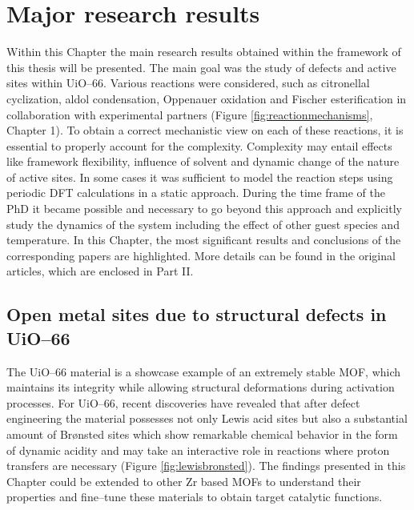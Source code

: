\graphicspath{{figures/}}
\renewcommand\evenpagerightmark{{\scshape\small Major research results}}
\renewcommand\oddpageleftmark{{\scshape\small Chapter 3}}


\hyphenation{}

\chapter[Major research results]%
{Major research results}
\label{ch3}
Within this Chapter the main research results obtained within the framework of
this thesis will be presented. The main goal was the study of defects and active
sites within UiO--66. Various reactions were considered, such as
citronellal cyclization, aldol condensation, Oppenauer oxidation and Fischer
esterification in
collaboration with experimental partners (Figure \ref{fig:reactionmechanisms},
Chapter 1).
To obtain a correct mechanistic view on each of these reactions, it is essential to properly account for the complexity.
Complexity may entail effects like framework
flexibility, influence of solvent and dynamic change of the nature of active
sites. In some cases it was sufficient to model the reaction steps using
periodic DFT calculations in a static approach.
During the time frame of the PhD it became possible and necessary to go beyond this approach
and explicitly study the dynamics of the system including the effect of other
guest species and temperature. In this Chapter, the most
significant results and conclusions of the corresponding papers are highlighted.
More details can be found in the original articles, which are enclosed in Part
II. 


\newpage
\section{Open metal sites due to structural defects in UiO--66}
The UiO--66 material is a showcase example of an extremely stable MOF, which
maintains its integrity while allowing structural deformations during
activation processes. For UiO--66, recent discoveries have
revealed that after defect engineering the material possesses not only Lewis acid sites but also a substantial amount of Br\o{}nsted sites which show
remarkable chemical behavior in the form of dynamic acidity and may take an
interactive role in reactions where proton transfers are necessary (Figure
\ref{fig:lewisbronsted}).
The findings presented in this Chapter could be extended to other Zr based MOFs
to understand their properties and fine--tune these materials to obtain
target catalytic functions.

